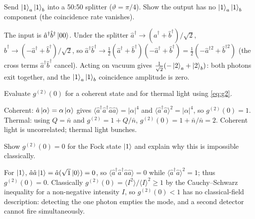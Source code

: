 \begin{exercise}
Send $\ket{1}_a\ket{1}_b$ into a 50:50 splitter
($\vartheta=\pi/4$). Show the output has no $\ket1_a\ket1_b$
component (the coincidence rate vanishes).
\begin{solution}
The input is $\hat a^\dagger\hat b^\dagger\ket{00}$. Under the
splitter $\hat a^\dagger\to(\hat a^\dagger+\hat b^\dagger)/\sqrt2$,
$\hat b^\dagger\to(-\hat a^\dagger+\hat b^\dagger)/\sqrt2$, so
$\hat a^\dagger\hat b^\dagger\to\tfrac12(\hat a^\dagger+\hat b^\dagger)(-\hat a^\dagger+\hat b^\dagger)
=\tfrac12(-\hat a^{\dagger2}+\hat b^{\dagger2})$ (the cross terms
$\hat a^\dagger\hat b^\dagger$ cancel). Acting on vacuum gives
$\tfrac1{\sqrt2}(-\ket{2}_a+\ket2_b)$: both photons exit together,
and the $\ket1_a\ket1_b$ coincidence amplitude is zero.
\end{solution}
\end{exercise}

\begin{exercise}
Evaluate $g^{(2)}(0)$ for a coherent state and for thermal light
using \cref{eq:g2}.
\begin{solution}
Coherent: $\hat a\ket\alpha=\alpha\ket\alpha$ gives
$\langle\hat a^\dagger\hat a^\dagger\hat a\hat a\rangle=|\alpha|^4$
and $\langle\hat a^\dagger\hat a\rangle^2=|\alpha|^4$, so
$g^{(2)}(0)=1$. Thermal: using $Q=\bar n$ and $g^{(2)}=1+Q/\bar n$,
$g^{(2)}(0)=1+\bar n/\bar n=2$. Coherent light is uncorrelated;
thermal light bunches.
\end{solution}
\end{exercise}

\begin{exercise}
Show $g^{(2)}(0)=0$ for the Fock state $\ket1$ and explain why this
is impossible classically.
\begin{solution}
For $\ket1$, $\hat a\hat a\ket1=\hat a(\sqrt1\ket0)=0$, so
$\langle\hat a^\dagger\hat a^\dagger\hat a\hat a\rangle=0$ while
$\langle\hat a^\dagger\hat a\rangle^2=1$; thus $g^{(2)}(0)=0$.
Classically $g^{(2)}(0)=\langle I^2\rangle/\langle I\rangle^2\geq1$
by the Cauchy--Schwarz inequality for a non-negative intensity
$I$, so $g^{(2)}(0)<1$ has no classical-field description: detecting
the one photon empties the mode, and a second detector cannot fire
simultaneously.
\end{solution}
\end{exercise}
